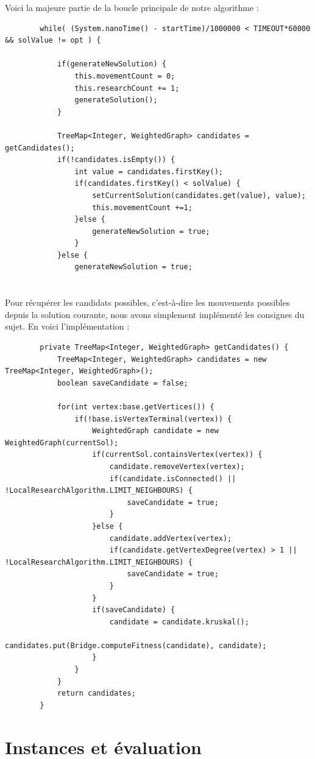 		Voici la majeure partie de la boucle principale de notre algorithme :
		\begin{lstlisting}
		while( (System.nanoTime() - startTime)/1000000 < TIMEOUT*60000 && solValue != opt ) {

			if(generateNewSolution) { 
				this.movementCount = 0;
				this.researchCount += 1;
				generateSolution(); 
			}

			TreeMap<Integer, WeightedGraph> candidates = getCandidates();
			if(!candidates.isEmpty()) {
				int value = candidates.firstKey();
				if(candidates.firstKey() < solValue) {
					setCurrentSolution(candidates.get(value), value);
					this.movementCount +=1;
				}else {
					generateNewSolution = true;
				}
			}else {
				generateNewSolution = true;
			
		\end{lstlisting}

	\paragraph{} Pour récupérer les candidats possibles, c'est-à-dire les mouvements possibles depuis la solution courante, nous avons simplement implémenté les consignes du sujet. En
voici l'implémentation :

		\begin{lstlisting}
		private TreeMap<Integer, WeightedGraph> getCandidates() {
			TreeMap<Integer, WeightedGraph> candidates = new TreeMap<Integer, WeightedGraph>();
			boolean saveCandidate = false;

			for(int vertex:base.getVertices()) {
				if(!base.isVertexTerminal(vertex)) {
					WeightedGraph candidate = new WeightedGraph(currentSol);
					if(currentSol.containsVertex(vertex)) {
						candidate.removeVertex(vertex);
						if(candidate.isConnected() || !LocalResearchAlgorithm.LIMIT_NEIGHBOURS) {
							saveCandidate = true;
						}
					}else {
						candidate.addVertex(vertex);
						if(candidate.getVertexDegree(vertex) > 1 || !LocalResearchAlgorithm.LIMIT_NEIGHBOURS) {
							saveCandidate = true;
						}
					}
					if(saveCandidate) {
						candidate = candidate.kruskal();
						candidates.put(Bridge.computeFitness(candidate), candidate);
					}
				}
			}
			return candidates;
		}
		\end{lstlisting}
\newpage
\section{Instances et évaluation}

